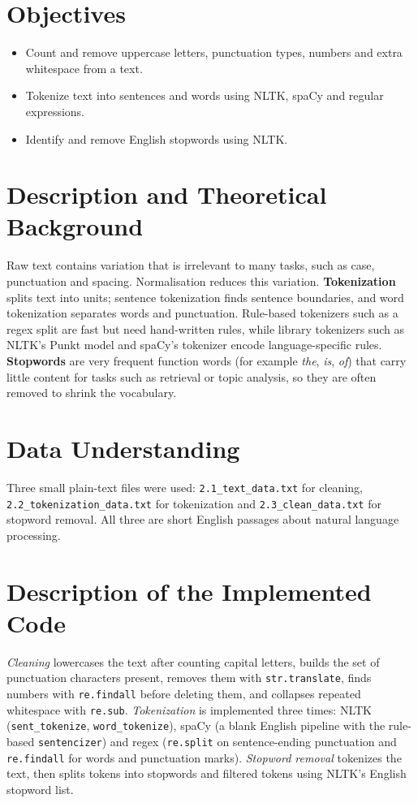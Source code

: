 \documentclass[12pt,a4paper,oneside]{report}
\begin{document}
\section{Objectives}
\begin{itemize}
\item Count and remove uppercase letters, punctuation types, numbers and extra whitespace from a text.
\item Tokenize text into sentences and words using NLTK, spaCy and regular expressions.
\item Identify and remove English stopwords using NLTK.
\end{itemize}

\section{Description and Theoretical Background}
Raw text contains variation that is irrelevant to many tasks, such as case, punctuation and spacing. Normalisation reduces this variation. \textbf{Tokenization} splits text into units; sentence tokenization finds sentence boundaries, and word tokenization separates words and punctuation. Rule-based tokenizers such as a regex split are fast but need hand-written rules, while library tokenizers such as NLTK's Punkt model and spaCy's tokenizer encode language-specific rules. \textbf{Stopwords} are very frequent function words (for example \emph{the}, \emph{is}, \emph{of}) that carry little content for tasks such as retrieval or topic analysis, so they are often removed to shrink the vocabulary.


\section{Data Understanding}
Three small plain-text files were used: \texttt{2.1\_text\_data.txt} for cleaning, \texttt{2.2\_tokenization\_data.txt} for tokenization and \texttt{2.3\_clean\_data.txt} for stopword removal. All three are short English passages about natural language processing.


\section{Description of the Implemented Code}
\emph{Cleaning} lowercases the text after counting capital letters, builds the set of punctuation characters present, removes them with \texttt{str.translate}, finds numbers with \texttt{re.findall} before deleting them, and collapses repeated whitespace with \texttt{re.sub}. \emph{Tokenization} is implemented three times: NLTK (\texttt{sent\_tokenize}, \texttt{word\_tokenize}), spaCy (a blank English pipeline with the rule-based \texttt{sentencizer}) and regex (\texttt{re.split} on sentence-ending punctuation and \texttt{re.findall} for words and punctuation marks). \emph{Stopword removal} tokenizes the text, then splits tokens into stopwords and filtered tokens using NLTK's English stopword list.
\end{document}
